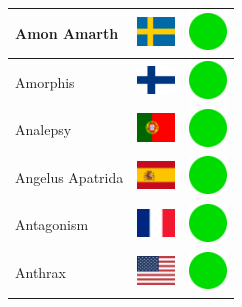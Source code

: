 \documentclass[12pt, a4paper, twoside]{report}
\begin{document}
\begin{center}
\begin{longtable}{|p{5cm}|p{2cm}|p{2cm}|}
Amon Amarth & \includegraphics[width=1cm]{4x3/se} & \includegraphics[width=1cm]{likes/y} \\ \hline
Amorphis & \includegraphics[width=1cm]{4x3/fi} & \includegraphics[width=1cm]{likes/y} \\ \hline
Analepsy & \includegraphics[width=1cm]{4x3/pt} & \includegraphics[width=1cm]{likes/y} \\ \hline
Angelus Apatrida & \includegraphics[width=1cm]{4x3/es} & \includegraphics[width=1cm]{likes/y} \\ \hline
Antagonism & \includegraphics[width=1cm]{4x3/fr} & \includegraphics[width=1cm]{likes/y} \\ \hline
Anthrax & \includegraphics[width=1cm]{4x3/us} & \includegraphics[width=1cm]{likes/y} \\ \hline

\end{longtable}
\end{center}
\end{document}
